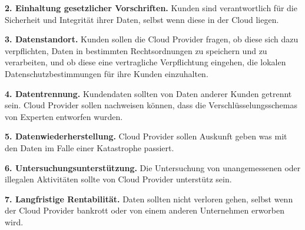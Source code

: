 \textbf{2. Einhaltung gesetzlicher Vorschriften.} Kunden sind verantwortlich für die Sicherheit und Integrität ihrer Daten, selbst wenn diese in der Cloud liegen.

\textbf{3. Datenstandort.} Kunden sollen die Cloud Provider fragen, ob diese sich dazu verpflichten, Daten in bestimmten Rechtsordnungen zu speichern und zu verarbeiten, und ob diese eine vertragliche Verpflichtung eingehen, die lokalen Datenschutzbestimmungen für ihre Kunden einzuhalten.

\textbf{4. Datentrennung.} Kundendaten sollten von Daten anderer Kunden getrennt sein. Cloud Provider sollen nachweisen können, dass die Verschlüsselungsschemas von Experten entworfen wurden.

\textbf{5. Datenwiederherstellung.} Cloud Provider sollen Auskunft geben was mit den Daten im Falle einer Katastrophe passiert.

\textbf{6. Untersuchungsunterstützung.} Die Untersuchung von unangemessenen oder illegalen Aktivitäten sollte von Cloud Provider unterstütz sein. 

\textbf{7. Langfristige Rentabilität.} Daten sollten nicht verloren gehen, selbst wenn der Cloud Provider bankrott oder von einem anderen Unternehmen erworben wird.


